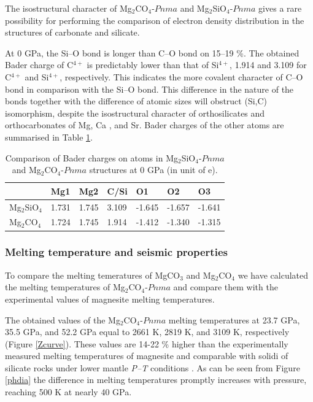 \documentclass[a4paperm]{article}
\begin{document}
The isostructural character of Mg$_2$CO$_4$-$Pnma$ and Mg$_2$SiO$_4$-$Pnma$ gives a rare possibility for performing the comparison of electron density distribution in the structures of carbonate and silicate.

At 0 GPa, the Si--O bond is longer than C--O bond on 15--19 \%.
The obtained Bader charge of C$^{4+}$ is predictably lower than that of Si$^{4+}$, 1.914 and 3.109 for C$^{4+}$ and Si$^{4+}$, respectively. 
This indicates the more covalent character of C--O bond in comparison with the Si--O bond.
This difference in the nature of the bonds together with the difference of atomic sizes will obstruct (Si,C) isomorphism, despite the isostructural character of orthosilicates and orthocarbonates of Mg, Ca \cite{sagatova2020_ortho}, and Sr\cite{laniel2021_sr2co4}.
Bader charges of the other atoms are summarised in Table \ref{t:bader}.

\begin{table}[h] \centering
	\caption{Comparison of Bader charges on atoms in Mg$_2$SiO$_4$-$Pnma$ and Mg$_2$CO$_4$-$Pnma$ structures at 0 GPa (in unit of e).} \vspace{2mm} \label{t:bader}
	\begin{tabular}{l l l l l l l }
        &       Mg1     &       Mg2     &       C/Si    &       O1      &       O2      &       O3      \\
		\hline
Mg$_2$SiO$_4$ &       1.731   &       1.745   &       3.109   &       -1.645  &       -1.657  &       -1.641  \\
Mg$_2$CO$_4$  &       1.724   &       1.745   &       1.914   &       -1.412  &       -1.340  &       -1.315  \\
		\hline 


	\end{tabular}
\end{table}


\subsubsection*{Melting temperature and seismic properties}
To compare the melting temeratures of MgCO$_3$ and Mg$_2$CO$_4$ we have calculated the melting temperatures of Mg$_2$CO$_4$-$Pnma$ and compare them with the experimental values of magnesite melting temperatures.

The obtained values of the Mg$_2$CO$_4$-$Pnma$ melting temperatures at 23.7 GPa, 35.5 GPa, and 52.2 GPa equal to 2661 K, 2819 K, and 3109 K, respectively (Figure \ref{Zcurve}).
These values are 14-22 \% higher than the experimentally measured melting temperatures of magnesite and comparable with solidi of silicate rocks under lower mantle {\it P--T} conditions \cite{litasov2018_review}.
As can be seen from Figure \ref{phdia} the difference in melting temperatures promptly increases with pressure, reaching 500 K at nearly 40 GPa.
\end{document}
